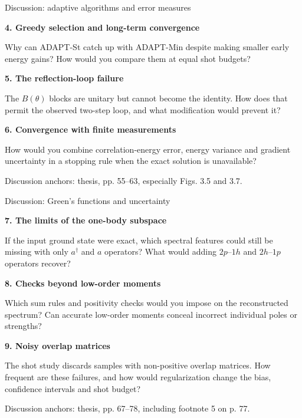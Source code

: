 \documentclass[11pt,aspectratio=169]{beamer}
\newcommand{\src}[1]{\par\vfill{\fontsize{7}{8}\selectfont\color{gray}#1\par}}
\newcommand{\question}[3]{\par\medskip\textbf{#1. #2}\par\smallskip #3\par}
\begin{document}
\begin{frame}{Discussion: adaptive algorithms and error measures}
\question{4}{Greedy selection and long-term convergence}{Why can ADAPT-St catch up with ADAPT-Min despite making smaller early energy gains? How would you compare them at equal shot budgets?}
\question{5}{The reflection-loop failure}{The $B(\theta)$ blocks are unitary but cannot become the identity. How does that permit the observed two-step loop, and what modification would prevent it?}
\question{6}{Convergence with finite measurements}{How would you combine correlation-energy error, energy variance and gradient uncertainty in a stopping rule when the exact solution is unavailable?}
\src{Discussion anchors: thesis, pp. 55--63, especially Figs. 3.5 and 3.7.}
\end{frame}

\begin{frame}{Discussion: Green's functions and uncertainty}
\question{7}{The limits of the one-body subspace}{If the input ground state were exact, which spectral features could still be missing with only $a^\dagger$ and $a$ operators? What would adding $2p$--$1h$ and $2h$--$1p$ operators recover?}
\question{8}{Checks beyond low-order moments}{Which sum rules and positivity checks would you impose on the reconstructed spectrum? Can accurate low-order moments conceal incorrect individual poles or strengths?}
\question{9}{Noisy overlap matrices}{The shot study discards samples with non-positive overlap matrices. How frequent are these failures, and how would regularization change the bias, confidence intervals and shot budget?}
\src{Discussion anchors: thesis, pp. 67--78, including footnote 5 on p. 77.}
\end{frame}
\end{document}
